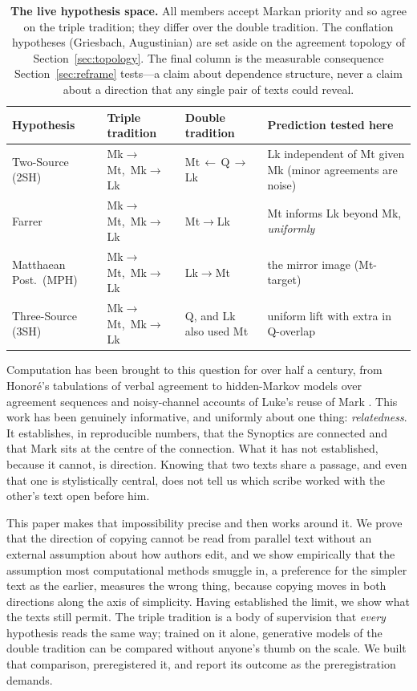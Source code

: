 \documentclass[11pt,letterpaper]{article}
\newcommand{\tblhead}{\rowcolor{marine!12}}
\begin{document}
\begin{table}[H]
\centering\small
\setlength{\tabcolsep}{5pt}
\begin{tabular}{L{2.6cm}L{2.9cm}L{3.2cm}L{3.9cm}}
\toprule
\tblhead\textbf{Hypothesis} & \textbf{Triple tradition} & \textbf{Double tradition} & \textbf{Prediction tested here} \\
\midrule
Two-Source (2SH) & Mk$\to$Mt,\ Mk$\to$Lk & Mt\,$\leftarrow$\,Q\,$\to$\,Lk & Lk independent of Mt given Mk (minor agreements are noise) \\
\addlinespace[2pt]
Farrer & Mk$\to$Mt,\ Mk$\to$Lk & Mt$\to$Lk & Mt informs Lk beyond Mk, \emph{uniformly} \\
\addlinespace[2pt]
Matthaean Post.\ (MPH) & Mk$\to$Mt,\ Mk$\to$Lk & Lk$\to$Mt & the mirror image (Mt-target) \\
\addlinespace[2pt]
Three-Source (3SH) & Mk$\to$Mt,\ Mk$\to$Lk & Q, and Lk also used Mt & uniform lift with extra in Q-overlap \\
\bottomrule
\end{tabular}
\caption{\textbf{The live hypothesis space.} All members accept Markan priority and so agree on the triple tradition; they differ over the double tradition. The conflation hypotheses (Griesbach, Augustinian) are set aside on the agreement topology of Section~\ref{sec:topology}. The final column is the measurable consequence Section~\ref{sec:reframe} tests---a claim about dependence structure, never a claim about a direction that any single pair of texts could reveal.}
\label{tab:hyp}
\end{table}

Computation has been brought to this question for over half a century, from Honor\'e's tabulations of verbal agreement \citep{honore1968} to hidden-Markov models over agreement sequences \citep{abakuks2015} and noisy-channel accounts of Luke's reuse of Mark \citep{lee2007}. This work has been genuinely informative, and uniformly about one thing: \emph{relatedness}. It establishes, in reproducible numbers, that the Synoptics are connected and that Mark sits at the centre of the connection. What it has not established, because it cannot, is direction. Knowing that two texts share a passage, and even that one is stylistically central, does not tell us which scribe worked with the other's text open before him.

This paper makes that impossibility precise and then works around it. We prove that the direction of copying cannot be read from parallel text without an external assumption about how authors edit, and we show empirically that the assumption most computational methods smuggle in, a preference for the simpler text as the earlier, measures the wrong thing, because copying moves in both directions along the axis of simplicity. Having established the limit, we show what the texts still permit. The triple tradition is a body of supervision that \emph{every} hypothesis reads the same way; trained on it alone, generative models of the double tradition can be compared without anyone's thumb on the scale. We built that comparison, preregistered it, and report its outcome as the preregistration demands.
\end{document}
